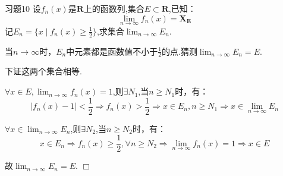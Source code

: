 \documentclass[11pt, a4paper, twoside]{ctexbook}
\newenvironment{proof2}{{\noindent\heiti 证明}}{\hfill $\Box $\par}
\begin{document}
	\begin{myproposition}{习题10}{}
		设$f_{n}(x)$是$\mathbf{R}$上的函数列,集合$E \subset \mathbf{R}$,已知：
        $$\lim_{n \to \infty}f_{n}(x)=\mathbf{X_{E}}$$
        记$E_{n}=\{x\mid f_{n}(x)\geq \displaystyle\frac{1}{2}\}$,求集合$\displaystyle\lim_{n \to \infty}E_{n}$.
	\end{myproposition}
    \begin{proof2}
		当$n \to \infty$时，$E_{n}$中元素都是函数值不小于$\displaystyle\frac{1}{2}$的点.猜测$\displaystyle\lim_{n \to \infty}E_{n}=E$. 


        下证这两个集合相等.


        $\forall x \in E,\displaystyle\lim_{n \to \infty}f_{n}(x)=1$,则$\exists N_{1}$,当$n\geq N_{1}$时，有：
        $$\mid f_{n}(x)-1\mid <\displaystyle\frac{1}{2}\Rightarrow f_{n}(x)>\frac{1}{2}\Rightarrow x \in E_{n},n\geq N_{1}\Rightarrow x \in \lim_{n \to \infty}E_{n}$$
        
		
		$\forall x \in \displaystyle\lim_{n \to \infty}E_{n}$,则$\exists N_{2}$,当$n\geq N_{2}$时，有：
        $$x \in E_{n} \Rightarrow f_{n}(x)\geq \frac{1}{2},\forall n \geq N_{2} \Rightarrow \lim_{n \to \infty}f_{n}(x)=1 \Rightarrow x \in E$$
       
		
		故$\displaystyle\lim_{n \to \infty}E_{n}=E$.
	\end{proof2}
\end{document}
